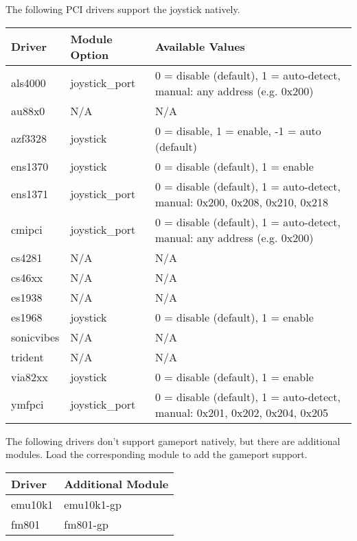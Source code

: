 \documentclass[a4paper,8pt,english]{sphinxmanual}
\begin{document}
The following PCI drivers support the joystick natively.

\begin{tabulary}{\linewidth}{|L|L|L|}
\hline
\textsf{\relax 
Driver
} & \textsf{\relax 
Module Option
} & \textsf{\relax 
Available Values
}\\
\hline
als4000
 & 
joystick\_port
 & 
0 = disable (default), 1 = auto-detect,
manual: any address (e.g. 0x200)
\\
\hline
au88x0
 & 
N/A
 & 
N/A
\\
\hline
azf3328
 & 
joystick
 & 
0 = disable, 1 = enable, -1 = auto (default)
\\
\hline
ens1370
 & 
joystick
 & 
0 = disable (default), 1 = enable
\\
\hline
ens1371
 & 
joystick\_port
 & 
0 = disable (default), 1 = auto-detect,
manual: 0x200, 0x208, 0x210, 0x218
\\
\hline
cmipci
 & 
joystick\_port
 & 
0 = disable (default), 1 = auto-detect,
manual: any address (e.g. 0x200)
\\
\hline
cs4281
 & 
N/A
 & 
N/A
\\
\hline
cs46xx
 & 
N/A
 & 
N/A
\\
\hline
es1938
 & 
N/A
 & 
N/A
\\
\hline
es1968
 & 
joystick
 & 
0 = disable (default), 1 = enable
\\
\hline
sonicvibes
 & 
N/A
 & 
N/A
\\
\hline
trident
 & 
N/A
 & 
N/A
\\
\hline
via82xx \protect\footnotemark[1]
 & 
joystick
 & 
0 = disable (default), 1 = enable
\\
\hline
ymfpci
 & 
joystick\_port
 & 
0 = disable (default), 1 = auto-detect,
manual: 0x201, 0x202, 0x204, 0x205 \protect\footnotemark[2]
\\
\hline\end{tabulary}

The following drivers don't support gameport natively, but there are
additional modules.  Load the corresponding module to add the gameport
support.

\begin{tabulary}{\linewidth}{|L|L|}
\hline
\textsf{\relax 
Driver
} & \textsf{\relax 
Additional Module
}\\
\hline
emu10k1
 & 
emu10k1-gp
\\
\hline
fm801
 & 
fm801-gp
\\
\hline\end{tabulary}
\end{document}
